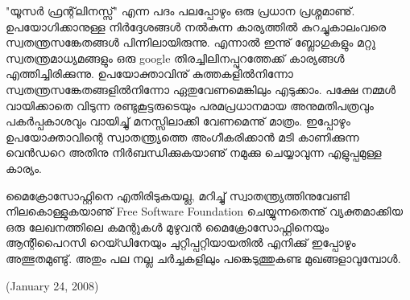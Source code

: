 "യൂസര്‍ ഫ്രന്റ്‌ലിനസ്സ്" എന്ന പദം പലപ്പോഴും ഒരു പ്രധാന പ്രശ്നമാണു്. ഉപയോഗിക്കാനുള്ള നിര്‍‌ദ്ദേശങ്ങള്‍ നല്‍കുന്ന കാര്യത്തില്‍ 
കുറച്ചുകാലംവരെ സ്വതന്ത്രസങ്കേതങ്ങള്‍ പിന്നിലായിരുന്നു. എന്നാല്‍ ഇന്നു് ബ്ലോഗുകളും മറ്റു സ്വതന്ത്രമാധ്യമങ്ങളും ഒരു google 
തിരച്ചിലിനപ്പുറത്തേക്ക് കാര്യങ്ങള്‍ എത്തിച്ചിരിക്കുന്നു. ഉപയോക്താവിനു് കുത്തകളില്‍നിന്നോ സ്വതന്ത്രസങ്കേതങ്ങളില്‍നിന്നോ 
ഏതുവേണമെങ്കിലും എടുക്കാം. പക്ഷേ നമ്മള്‍ വായിക്കാതെ വിടുന്ന രണ്ടുകൂട്ടരുടെയും പരമപ്രധാനമായ അനുമതിപത്രവും 
പകര്‍പ്പകാശവും വായിച്ചു് മനസ്സിലാക്കി വേണമെന്നു് മാത്രം. ഇപ്പോഴും ഉപയോക്താവിന്റെ സ്വാതന്ത്ര്യത്തെ അംഗീകരിക്കാന്‍ മടി 
കാണിക്കുന്ന വെന്‍ഡറെ അതിനു നിര്‍ബന്ധിക്കുകയാണു് നമുക്കു ചെയ്യാവുന്ന എളുപ്പമുള്ള കാര്യം.

മൈക്രോസോഫ്റ്റിനെ എതിരിടുകയല്ല, മറിച്ചു് സ്വാതന്ത്ര്യത്തിനുവേണ്ടി നിലകൊള്ളുകയാണു് Free Software Foundation 
ചെയ്യുന്നതെന്നു് വ്യക്തമാക്കിയ ഒരു ലേഖനത്തിലെ കമന്റുകള്‍ മുഴുവന്‍ മൈക്രോസോഫ്റ്റിനെയും ആന്റിപൈറസി റെയ്ഡിനേയും 
ചുറ്റിപ്പറ്റിയായതില്‍ എനിക്കു് ഇപ്പോഴും അത്ഭുതമുണ്ടു്. അതും പല നല്ല ചര്‍ച്ചകളിലും പങ്കെടുത്തുകണ്ട മുഖങ്ങളാവുമ്പോള്‍.


\begin{flushright}(January 24, 2008)\end{flushright}
\newpage
